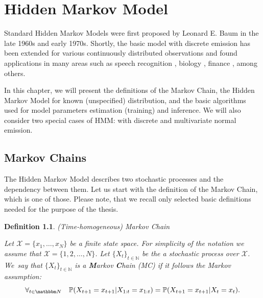 \documentclass[shortabstract]{iithesis}
\newtheorem{definition}{Definition}
\begin{document}
\pagebreak

\chapter{Hidden Markov Model} \label{sec:HMM_theory}

Standard Hidden Markov Models were first proposed by Leonard E. Baum  \cite{mor_systematic_2021} in the late 1960s and early 1970s. Shortly, the basic model with discrete emission has been extended for various continuously distributed observations and found applications in many areas such as speech recognition \cite{picone_continuous_1990}\cite{deshmukh_comparison_2020}, biology \cite{krogh_hidden_1994}\cite{momenzadeh_using_2020}, finance \cite{siu_hidden_2014}\cite{zhang_high-order_2019}, among others. 

In this chapter, we will present the definitions of the Markov Chain, the Hidden Markov Model for known (unspecified) distribution, and the basic algorithms used for model parameters estimation (training) and inference. We will also consider two special cases of HMM: with discrete and multivariate normal emission. 

\section{Markov Chains}  \label{sec:MC}

The Hidden Markov Model describes two stochastic processes and the dependency between them. Let us start with the definition of the Markov Chain, which is one of those. Please note, that we recall only selected basic definitions needed for the purpose of the thesis. 

\begin{definition}{(Time-homogeneous) Markov Chain} \label{def:MC}

Let $\mathcal{X}=\{x_1, \ldots, x_N\}$ be a finite state space. For simplicity of the notation we assume that $\mathcal{X}=\{1, 2,  \ldots, N\}$. Let $\{X_t\}_{t \in \mathbb N}$ be the a stochastic process over $\mathcal X$. We~say that $\{X_t\}_{t \in \mathbb N}$ is a \textbf{M}arkov \textbf{C}hain  (MC) if  it follows the Markov assumption:
\begin{equation*}
    \forall_{t \in \mathbbm N} \quad \mathbb P(X_{t+1} = x_{t+1}|X_{1:t}= x_{1:t}) = \mathbb P(X_{t+1} = x_{t+1}|X_{t}= x_{t})\text{.}
\end{equation*}
\end{definition}
\end{document}
